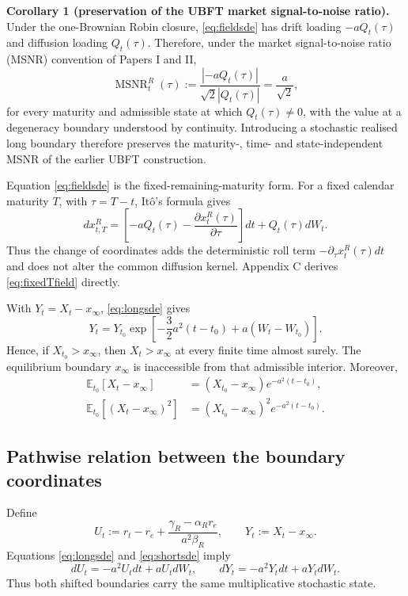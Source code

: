 \documentclass[11pt]{article}
\numberwithin{equation}{section}
\newcommand{\E}{\mathbb{E}}
\begin{document}
\medskip
\noindent\textbf{Corollary 1 (preservation of the UBFT market signal-to-noise ratio).} Under the one-Brownian Robin closure, \eqref{eq:fieldsde} has drift loading $-aQ_t(\tau)$ and diffusion loading $Q_t(\tau)$. Therefore, under the market signal-to-noise ratio (MSNR) convention of Papers I and II,
\begin{equation}
 \operatorname{MSNR}_t^R(\tau)
 :=\frac{\left|-aQ_t(\tau)\right|}{\sqrt{2}\left|Q_t(\tau)\right|}
 =\frac{a}{\sqrt{2}},
 \label{eq:msnrpreserved}
\end{equation}
for every maturity and admissible state at which $Q_t(\tau)\neq0$, with the value at a degeneracy boundary understood by continuity. Introducing a stochastic realised long boundary therefore preserves the maturity-, time- and state-independent MSNR of the earlier UBFT construction.
\medskip

Equation \eqref{eq:fieldsde} is the fixed-remaining-maturity form. For a fixed calendar maturity $T$, with $\tau=T-t$, It\^o's formula gives
\begin{equation}
 d x_{t,T}^R
 =\left[-aQ_t(\tau)-\frac{\partial x_t^R(\tau)}{\partial\tau}\right]dt
 +Q_t(\tau)dW_t.
 \label{eq:fixedTfield}
\end{equation}
Thus the change of coordinates adds the deterministic roll term $-\partial_\tau x_t^R(\tau)dt$ and does not alter the common diffusion kernel. Appendix C derives \eqref{eq:fixedTfield} directly.

With $Y_t=X_t-x_\infty$, \eqref{eq:longsde} gives
\begin{equation}
 Y_t=Y_{t_0}\exp\left[-\frac32a^2(t-t_0)+a(W_t-W_{t_0})\right].
\end{equation}
Hence, if $X_{t_0}>x_\infty$, then $X_t>x_\infty$ at every finite time almost surely. The equilibrium boundary $x_\infty$ is inaccessible from that admissible interior. Moreover,
\begin{align}
 \E_{t_0}[X_t-x_\infty]
 &=(X_{t_0}-x_\infty)e^{-a^2(t-t_0)},\\
 \E_{t_0}[(X_t-x_\infty)^2]
 &=(X_{t_0}-x_\infty)^2e^{-a^2(t-t_0)}.
\end{align}


\subsection{Pathwise relation between the boundary coordinates}

Define
\begin{equation}
 U_t:=r_t-r_e+\frac{\gamma_R-\alpha_Rr_e}{a^2\beta_R},
 \qquad
 Y_t:=X_t-x_\infty.
 \label{eq:UYdefinition}
\end{equation}
Equations \eqref{eq:longsde} and \eqref{eq:shortsde} imply
\begin{equation}
 dU_t=-a^2U_tdt+aU_tdW_t,
 \qquad
 dY_t=-a^2Y_tdt+aY_tdW_t.
 \label{eq:UYdynamics}
\end{equation}
Thus both shifted boundaries carry the same multiplicative stochastic state.
\end{document}
